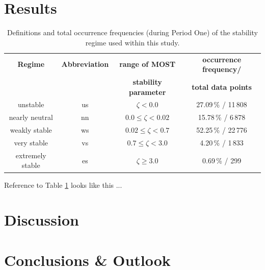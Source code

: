 \section{Results}
\label{john:results}
\lipsum

\begin{table}[htbp]
    \setlength\belowcaptionskip{1.5ex}
    \centering
    \caption[Stability regime definitions]{Definitions and total occurrence frequencies (during Period One) of the stability regime used within this study.}
    \label{john:table_stab_regimes}
    \begin{tabular}{|c|c|c|c|}
    \hline
    \textbf{Regime} & \textbf{Abbreviation} & \textbf{range of MOST} & \textbf{occurrence frequency/} \\
     & & \textbf{stability parameter} & \textbf{total data points} \\ \hline
    unstable & us & $\zeta < 0.0$ & 27.09\,\% / 11\,808 \\ \hline
    nearly neutral & nn & $0.0 \leq \zeta < 0.02$ & 15.78\,\% / 6\,878 \\ \hline
    weakly stable & ws & $0.02 \leq \zeta < 0.7$ & 52.25\,\% / 22\,776 \\ \hline
    very stable & vs & $0.7 \leq \zeta < 3.0$ & 4.20\,\% / 1\,833 \\ \hline
    extremely stable & es & $\zeta \geq 3.0$ & 0.69\,\% / 299 \\ \hline
    \end{tabular}
\end{table}

Reference to Table \ref{john:table_stab_regimes} looks like this ...


\section{Discussion}
\label{john:discussion}
\lipsum

\section{Conclusions \& Outlook}
\label{john:conclusion}
\lipsum

\vspace{3cm}

